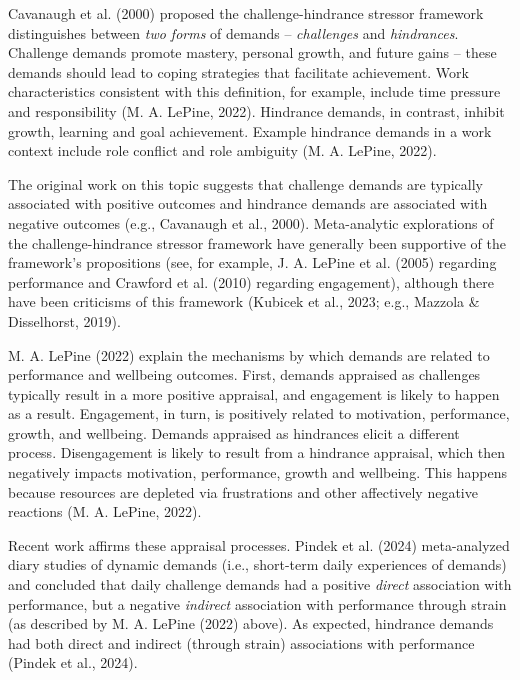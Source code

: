 \documentclass[
  man]{apa7}
\begin{document}
Cavanaugh et al. (2000) proposed the challenge-hindrance stressor framework distinguishes between \emph{two forms} of demands -- \emph{challenges} and \emph{hindrances}. Challenge demands promote mastery, personal growth, and future gains -- these demands should lead to coping strategies that facilitate achievement. Work characteristics consistent with this definition, for example, include time pressure and responsibility (M. A. LePine, 2022). Hindrance demands, in contrast, inhibit growth, learning and goal achievement. Example hindrance demands in a work context include role conflict and role ambiguity (M. A. LePine, 2022).

The original work on this topic suggests that challenge demands are typically associated with positive outcomes and hindrance demands are associated with negative outcomes (e.g., Cavanaugh et al., 2000). Meta-analytic explorations of the challenge-hindrance stressor framework have generally been supportive of the framework's propositions (see, for example, J. A. LePine et al. (2005) regarding performance and Crawford et al. (2010) regarding engagement), although there have been criticisms of this framework (Kubicek et al., 2023; e.g., Mazzola \& Disselhorst, 2019).

M. A. LePine (2022) explain the mechanisms by which demands are related to performance and wellbeing outcomes. First, demands appraised as challenges typically result in a more positive appraisal, and engagement is likely to happen as a result. Engagement, in turn, is positively related to motivation, performance, growth, and wellbeing. Demands appraised as hindrances elicit a different process. Disengagement is likely to result from a hindrance appraisal, which then negatively impacts motivation, performance, growth and wellbeing. This happens because resources are depleted via frustrations and other affectively negative reactions (M. A. LePine, 2022).

Recent work affirms these appraisal processes. Pindek et al. (2024) meta-analyzed diary studies of dynamic demands (i.e., short-term daily experiences of demands) and concluded that daily challenge demands had a positive \emph{direct} association with performance, but a negative \emph{indirect} association with performance through strain (as described by M. A. LePine (2022) above). As expected, hindrance demands had both direct and indirect (through strain) associations with performance (Pindek et al., 2024).
\end{document}
